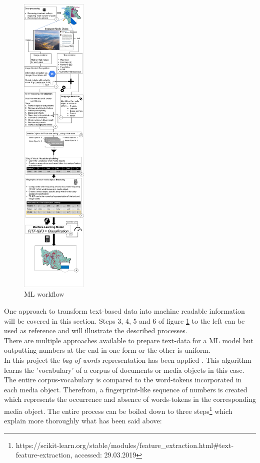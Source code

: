 \begin{figure} %
    \centerline{\includegraphics[trim={0 0 0 0},clip,width=0.28\textwidth]{img/ML_text_data_visualization_cropped.pdf}}
  \caption{ML workflow}
  \label{fig:ml_visualisation}
\end{figure}
One approach to transform text-based data into machine readable information will be covered in this section. Steps 3, 4, 5 and 6 of figure \ref{fig:ml_visualisation} to the left can be used as reference and will illustrate the described processes.\\
There are multiple approaches available to prepare text-data for a ML model but outputting numbers at the end in one form or the other is uniform.\\
In this project the \textit{bag-of-words} representation has been applied \parencite{Joulin2016}. This algorithm learns the 'vocabulary' of a corpus of documents or media objects in this case. The entire corpus-vocabulary is compared to the word-tokens incorporated in each media object. Therefrom, a fingerprint-like sequence of numbers is created which represents the occurrence and absence of words-tokens in the corresponding media object. The entire process can be boiled down to three steps\footnote{https://scikit-learn.org/stable/modules/feature\_extraction.html\#text-feature-extraction, accessed: 29.03.2019} which explain more thoroughly what has been said above:

